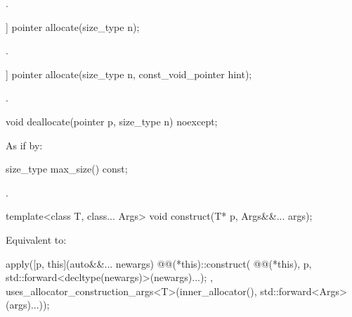 \begin{itemdescr}
\pnum
\returns {}.
\end{itemdescr}

%
\begin{itemdecl}
[[nodiscard]] pointer allocate(size_type n);
\end{itemdecl}

\begin{itemdescr}
\pnum
\returns {}.
\end{itemdescr}

%
\begin{itemdecl}
[[nodiscard]] pointer allocate(size_type n, const_void_pointer hint);
\end{itemdecl}

\begin{itemdescr}
\pnum
\returns {}.
\end{itemdescr}

%
\begin{itemdecl}
void deallocate(pointer p, size_type n) noexcept;
\end{itemdecl}

\begin{itemdescr}
\pnum
\effects As if by:
\end{itemdescr}

%
\begin{itemdecl}
size_type max_size() const;
\end{itemdecl}

\begin{itemdescr}
\pnum
\returns {}.
\end{itemdescr}

%
\begin{itemdecl}
template<class T, class... Args>
  void construct(T* p, Args&&... args);
\end{itemdecl}

\begin{itemdescr}
\pnum
\effects
Equivalent to:
\begin{codeblock}
apply([p, this](auto&&... newargs) {
        @@(*this)::construct(
          @@(*this), p,
          std::forward<decltype(newargs)>(newargs)...);
      },
      uses_allocator_construction_args<T>(inner_allocator(),
                                          std::forward<Args>(args)...));
\end{codeblock}
\end{itemdescr}

